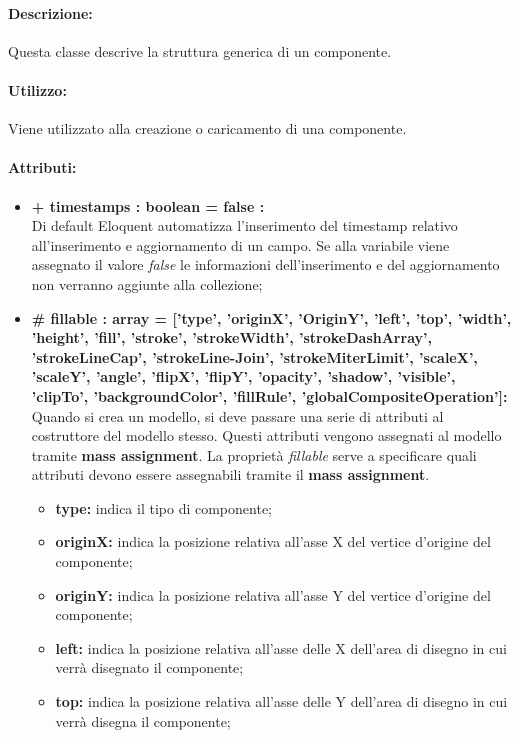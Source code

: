 	\paragraph{Descrizione:}
	Questa classe descrive la struttura generica di un componente.
	
	\paragraph{Utilizzo:}
	Viene utilizzato alla creazione o caricamento di una componente.
	
	\paragraph{Attributi:}
	\begin{itemize}
		\item \textbf{+ timestamps : boolean = false :}\\
		Di default Eloquent automatizza l'inserimento del timestamp relativo all'inserimento e aggiornamento di un campo. Se alla variabile viene assegnato il valore \textit{false} le informazioni dell'inserimento e del aggiornamento non verranno aggiunte alla collezione;
		\item \textbf{\# fillable : array = [’type’, ’originX’, ’OriginY’, ’left’, ’top’, ’width’, ’height’, ’fill’, ’stroke’, ’strokeWidth’, ’strokeDashArray’, ’strokeLineCap’, ’strokeLine-Join’, ’strokeMiterLimit’, ’scaleX’, ’scaleY’, ’angle’, ’flipX’, ’flipY’, ’opacity’, ’shadow’, ’visible’, ’clipTo’, ’backgroundColor’, ’fillRule’, ’globalCompositeOperation']:}\\
		Quando si crea un modello, si deve passare una serie di attributi al costruttore del modello stesso. Questi attributi vengono assegnati al modello tramite \textbf{mass assignment}. La proprietà \textit{fillable} serve a specificare quali attributi devono essere assegnabili tramite il \textbf{mass assignment}.
		\begin{itemize}
			\item \textbf{type:} indica il tipo di componente;
			\item \textbf{originX:} indica la posizione relativa all'asse X del vertice d'origine del componente;
			\item \textbf{originY:} indica la posizione relativa all'asse Y del vertice d'origine del componente;
			\item \textbf{left:} indica la posizione relativa all'asse delle X dell'area di disegno in cui verrà disegnato il componente;
			\item \textbf{top:} indica la posizione relativa all'asse delle Y dell'area di disegno in cui verrà disegna il componente;

\end{itemize}
\end{itemize}
